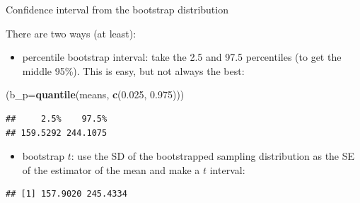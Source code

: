 \documentclass[
  ignorenonframetext,
]{beamer}
\newenvironment{Shaded}{\begin{snugshade}}{\end{snugshade}}
\newcommand{\DataTypeTok}[1]{\textcolor[rgb]{0.13,0.29,0.53}{#1}}
\newcommand{\DecValTok}[1]{\textcolor[rgb]{0.00,0.00,0.81}{#1}}
\newcommand{\FloatTok}[1]{\textcolor[rgb]{0.00,0.00,0.81}{#1}}
\newcommand{\KeywordTok}[1]{\textcolor[rgb]{0.13,0.29,0.53}{\textbf{#1}}}
\newcommand{\NormalTok}[1]{#1}
\newcommand{\OperatorTok}[1]{\textcolor[rgb]{0.81,0.36,0.00}{\textbf{#1}}}
\providecommand{\tightlist}{%
  \setlength{\itemsep}{0pt}\setlength{\parskip}{0pt}}
\begin{document}
\begin{frame}[fragile]{Confidence interval from the bootstrap
distribution}
\protect\hypertarget{confidence-interval-from-the-bootstrap-distribution}{}

There are two ways (at least):

\begin{itemize}
\tightlist
\item
  percentile bootstrap interval: take the 2.5 and 97.5 percentiles (to
  get the middle 95\%). This is easy, but not always the best:
\end{itemize}

\begin{Shaded}
\begin{Highlighting}[]
\NormalTok{(}\DataTypeTok{b_p=}\KeywordTok{quantile}\NormalTok{(means, }\KeywordTok{c}\NormalTok{(}\FloatTok{0.025}\NormalTok{, }\FloatTok{0.975}\NormalTok{)))}
\end{Highlighting}
\end{Shaded}

\begin{verbatim}
##     2.5%    97.5% 
## 159.5292 244.1075
\end{verbatim}

\begin{itemize}
\tightlist
\item
  bootstrap \(t\): use the SD of the bootstrapped sampling distribution
  as the SE of the estimator of the mean and make a \(t\) interval:
\end{itemize}

\begin{Shaded}
\end{Shaded}

\begin{verbatim}
## [1] 157.9020 245.4334
\end{verbatim}

\end{frame}
\end{document}

